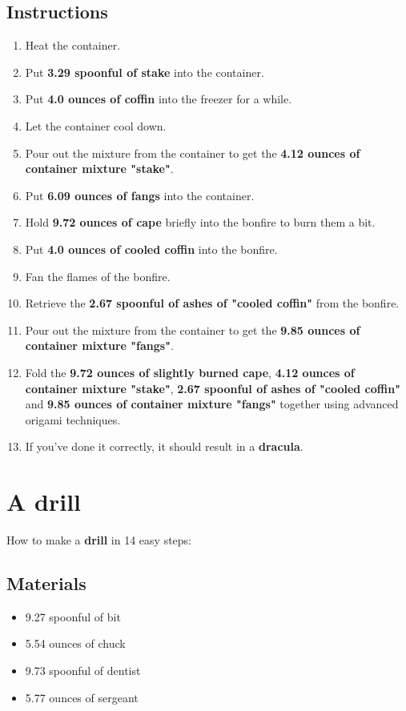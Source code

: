 \documentclass{article}
\begin{document}
\subsection{Instructions}\begin{enumerate}
\item 
Heat the container.
\item 
Put \textbf{3.29 spoonful of stake} into the container.
\item 
Put \textbf{4.0 ounces of coffin} into the freezer for a while.
\item 
Let the container cool down.
\item 
Pour out the mixture from the container to get the \textbf{4.12 ounces of container mixture "stake"}.
\item 
Put \textbf{6.09 ounces of fangs} into the container.
\item 
Hold \textbf{9.72 ounces of cape} briefly into the bonfire to burn them a bit.
\item 
Put \textbf{4.0 ounces of cooled coffin} into the bonfire.
\item 
Fan the flames of the bonfire.
\item 
Retrieve the \textbf{2.67 spoonful of ashes of "cooled coffin"} from the bonfire.
\item 
Pour out the mixture from the container to get the \textbf{9.85 ounces of container mixture "fangs"}.
\item 
Fold the \textbf{9.72 ounces of slightly burned cape}, \textbf{4.12 ounces of container mixture "stake"}, \textbf{2.67 spoonful of ashes of "cooled coffin"} and \textbf{9.85 ounces of container mixture "fangs"} together using advanced origami techniques.
\item 
If you've done it correctly, it should result in a \textbf{dracula}.
\end{enumerate}
\newpage
\section{A drill}How to make a \textbf{drill} in 14 easy steps:

\subsection{Materials}\begin{itemize}
\item 
9.27 spoonful of bit
\item 
5.54 ounces of chuck
\item 
9.73 spoonful of dentist
\item 
5.77 ounces of sergeant
\end{itemize}
\end{document}
